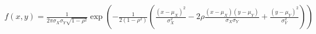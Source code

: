 \documentclass[preview]{standalone}
\begin{document}
\begin{align*}
f(x, y) = \frac{1}{2 \pi \sigma_X \sigma_Y \sqrt{1 -  \rho ^2}} \exp \left( -\frac{1}{2(1 -  \rho ^2)} \left( \frac{(x - \mu_X)^2}{\sigma_X^2} - 2  \rho  \frac{(x - \mu_X)(y - \mu_Y)}{\sigma_X \sigma_Y} + \frac{(y - \mu_Y)^2}{\sigma_Y^2} \right) \right)
\end{align*}
\end{document}

